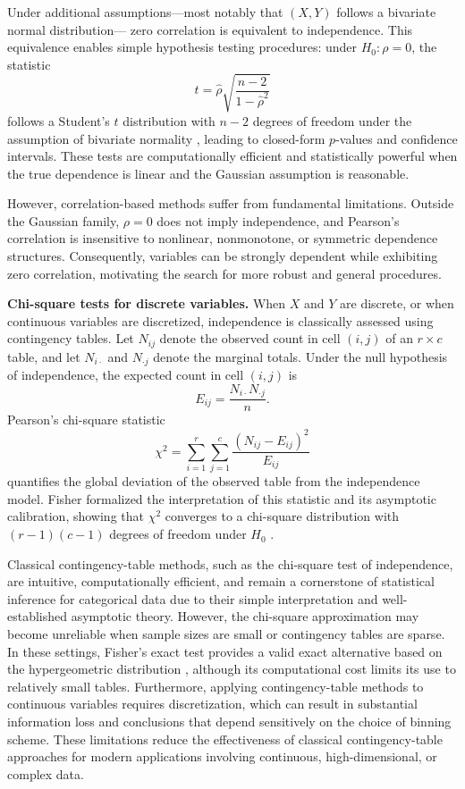 \documentclass[12pt,reqno,oneside]{amsbook}
\theoremstyle{definition}
\theoremstyle{remark}
\begin{document}
Under additional assumptions—most notably that $(X,Y)$ follows a bivariate normal distribution—
zero correlation is equivalent to independence.
This equivalence enables simple hypothesis testing procedures:
under $H_0:\rho=0$, the statistic
\[
t = \hat\rho \sqrt{\frac{n-2}{1-\hat\rho^2}}
\]
follows a Student's $t$ distribution with $n-2$ degrees of freedom%
under the assumption of bivariate normality
\citep{Student1908,Fisher1915},
leading to closed-form $p$-values and confidence intervals.
These tests are computationally efficient and statistically powerful
when the true dependence is linear and the Gaussian assumption is reasonable.

However, correlation-based methods suffer from fundamental limitations.
Outside the Gaussian family, $\rho=0$ does not imply independence,
and Pearson’s correlation is insensitive to nonlinear, nonmonotone,
or symmetric dependence structures.
Consequently, variables can be strongly dependent while exhibiting zero correlation,
motivating the search for more robust and general procedures.

\textbf{Chi-square tests for discrete variables.}
When $X$ and $Y$ are discrete, or when continuous variables are discretized,
independence is classically assessed using contingency tables.
Let $N_{ij}$ denote the observed count in cell $(i,j)$ of an $r\times c$ table,
and let $N_{i\cdot}$ and $N_{\cdot j}$ denote the marginal totals.
Under the null hypothesis of independence,
the expected count in cell $(i,j)$ is
\[
E_{ij} = \frac{N_{i\cdot}N_{\cdot j}}{n}.
\]
Pearson’s chi-square statistic
\[
\chi^2 = \sum_{i=1}^r\sum_{j=1}^c \frac{(N_{ij}-E_{ij})^2}{E_{ij}}
\]
quantifies the global deviation of the observed table from the independence model.
Fisher formalized the interpretation of this statistic and its asymptotic calibration,
showing that $\chi^2$ converges to a chi-square distribution with
$(r-1)(c-1)$ degrees of freedom under $H_0$%
\citep{Fisher1922}.

Classical contingency-table methods, such as the chi-square test of independence, are intuitive, computationally efficient, and remain a cornerstone of statistical inference for categorical data due to their simple interpretation and well-established asymptotic theory. However, the chi-square approximation may become unreliable when sample sizes are small or contingency tables are sparse. In these settings, Fisher's exact test provides a valid exact alternative based on the hypergeometric distribution \citep{Fisher1922}, although its computational cost limits its use to relatively small tables. Furthermore, applying contingency-table methods to continuous variables requires discretization, which can result in substantial information loss and conclusions that depend sensitively on the choice of binning scheme. These limitations reduce the effectiveness of classical contingency-table approaches for modern applications involving continuous, high-dimensional, or complex data.
\end{document}
